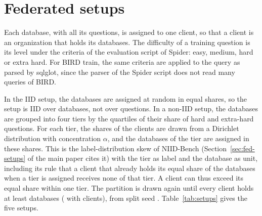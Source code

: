 \section{Federated setups}\label{sup:setups}

Each database, with all its questions, is assigned to one client, so that
a client is an organization that holds its databases. The difficulty of
a training question is its level under the criteria of the evaluation
script of Spider: easy, medium, hard or extra hard. For BIRD train, the
same criteria are applied to the query as parsed by sqlglot, since the
parser of the Spider script does not read many queries of BIRD.

In the IID setup, the databases are assigned at random in equal shares,
so the setup is IID over databases, not over questions. In a non-IID
setup, the databases are grouped into four tiers by the quartiles of
their share of hard and extra-hard questions. For each tier, the shares
of the clients are drawn from a Dirichlet distribution with
concentration $\alpha$, and the databases of the tier are assigned in
these shares. This is the label-distribution skew of NIID-Bench
(Section~\ref{sec:fed-setups} of the main paper cites it) with the tier
as label and the database as unit, including its rule that a client
that already holds its equal share of the databases when a tier is
assigned receives none of that tier. A client can thus exceed its equal
share within one tier. The partition is drawn again until every client
holds at least  databases
( with
 clients), from split seed
. Table~\ref{tab:setups} gives the five setups.

\begin{table}[!ht]
\caption{Federated setups. Each row partitions a training set among its
clients, IID or with Dirichlet concentration $\alpha$. ``Per client''
gives the smallest and the largest client, and ``Hard or extra'' gives the range over the
clients of the share of a client's questions at the hard or extra-hard
level.}\label{tab:setups}
\footnotesize

\end{table}
